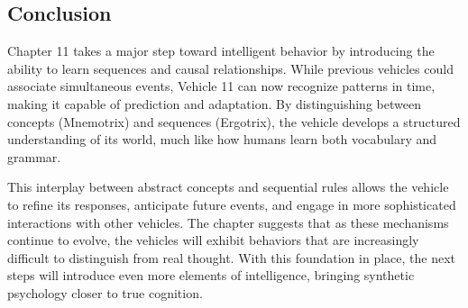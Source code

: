\documentclass{article}
\begin{document}
	\subsection*{Conclusion}

	Chapter 11 takes a major step toward intelligent behavior by introducing the ability to learn sequences and causal relationships. While previous vehicles could associate simultaneous events, Vehicle 11 can now recognize patterns in time, making it capable of prediction and adaptation. By distinguishing between concepts (Mnemotrix) and sequences (Ergotrix), the vehicle develops a structured understanding of its world, much like how humans learn both vocabulary and grammar.

	This interplay between abstract concepts and sequential rules allows the vehicle to refine its responses, anticipate future events, and engage in more sophisticated interactions with other vehicles. The chapter suggests that as these mechanisms continue to evolve, the vehicles will exhibit behaviors that are increasingly difficult to distinguish from real thought. With this foundation in place, the next steps will introduce even more elements of intelligence, bringing synthetic psychology closer to true cognition.
		
\end{document}
